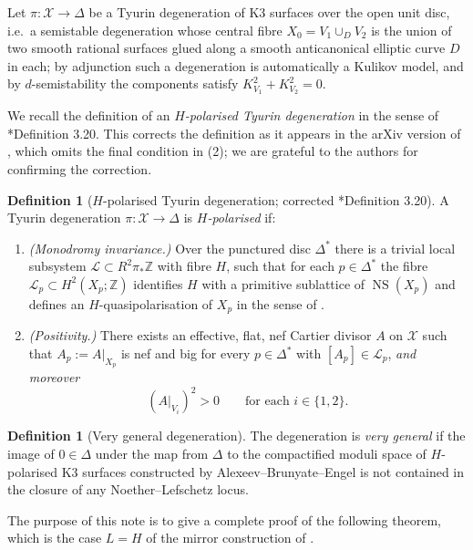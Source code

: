 \documentclass[11pt]{amsart}
\theoremstyle{plain}
\theoremstyle{definition}
\newtheorem{definition}[theorem]{Definition}
\newcommand{\Z}{\mathbb{Z}}
\newcommand{\NS}{\operatorname{NS}}
\newcommand{\cX}{\mathcal{X}}
\begin{document}
Let $\pi\colon \cX\to\Delta$ be a Tyurin degeneration of K3 surfaces over the
open unit disc, i.e.\ a semistable degeneration whose central fibre
$X_0=V_1\cup_D V_2$ is the union of two smooth rational surfaces glued along a
smooth anticanonical elliptic curve $D$ in each; by adjunction such a
degeneration is automatically a Kulikov model, and by $d$-semistability
\cite{Fri83,Kul77,PP81} the components satisfy $K_{V_1}^2+K_{V_2}^2=0$.

We recall the definition of an \emph{$H$-polarised Tyurin degeneration} in the
sense of \cite{dfk3slpms}*{Definition 3.20}. This corrects the definition as it
appears in the arXiv version of \cite{dfk3slpms}, which omits the final
condition in (2); we are grateful to the authors for confirming the correction.

\begin{definition}[{$H$-polarised Tyurin degeneration; corrected
\cite{dfk3slpms}*{Definition 3.20}}]\label{def:hpolariseddegeneration}
A Tyurin degeneration $\pi\colon \cX\to\Delta$ is \emph{$H$-polarised} if:
\begin{enumerate}
  \item[(1)] \emph{(Monodromy invariance.)} Over the punctured disc $\Delta^*$
  there is a trivial local subsystem $\mathcal{L}\subset R^2\pi_*\Z$ with fibre
  $H$, such that for each $p\in\Delta^*$ the fibre
  $\mathcal{L}_p\subset H^2(X_p;\Z)$ identifies $H$ with a primitive
  sublattice of $\NS(X_p)$ and defines an $H$-quasipolarisation of $X_p$ in the
  sense of \cite{Dol96}.
  \item[(2)] \emph{(Positivity.)} There exists an effective, flat, nef Cartier
  divisor $A$ on $\cX$ such that $A_p:=A|_{X_p}$ is nef and big for every
  $p\in\Delta^*$ with $[A_p]\in\mathcal{L}_p$, \emph{and moreover}
  \[
  (A|_{V_i})^2>0\qquad\text{for each }i\in\{1,2\}.
  \]
\end{enumerate}
\end{definition}

\begin{definition}[{Very general degeneration}]
The degeneration is \emph{very general} if the image of $0\in\Delta$ under the
map from $\Delta$ to the compactified moduli space of $H$-polarised K3 surfaces
constructed by Alexeev--Brunyate--Engel \cite{cmek3sspt} is not contained in
the closure of any Noether--Lefschetz locus.
\end{definition}

The purpose of this note is to give a complete proof of the following theorem,
which is the case $L=H$ of the mirror construction of \cite{dfk3slpms}.
\end{document}
